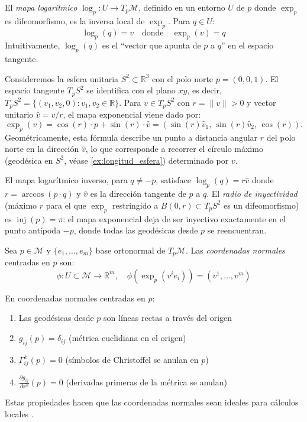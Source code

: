 \begin{definition}\label{def:mapa_logaritmico}
El \textit{mapa logarítmico} $\log_p: U \to T_p\mathcal{M}$, definido en un entorno $U$ de $p$ donde $\exp_p$ es difeomorfismo, es la inversa local de $\exp_p$. Para $q \in U$:
\[
\log_p(q) = v \quad \text{donde} \quad \exp_p(v) = q
\]
Intuitivamente, $\log_p(q)$ es el ``vector que apunta de $p$ a $q$'' en el espacio tangente.
\end{definition}

\begin{example}\label{ex:mapa_exp_esfera}
Consideremos la esfera unitaria $S^2 \subset \mathbb{R}^3$ con el polo norte $p = (0, 0, 1)$. El espacio tangente $T_p S^2$ se identifica con el plano $xy$, es decir, $T_p S^2 = \{(v_1, v_2, 0) : v_1, v_2 \in \mathbb{R}\}$. Para $v \in T_p S^2$ con $r = \|v\| > 0$ y vector unitario $\hat{v} = v/r$, el mapa exponencial viene dado por:
\[
\exp_p(v) = \cos(r) \cdot p + \sin(r) \cdot \hat{v} = (\sin(r) \hat{v}_1, \, \sin(r) \hat{v}_2, \, \cos(r)).
\]
Geométricamente, esta fórmula describe un punto a distancia angular $r$ del polo norte en la dirección $\hat{v}$, lo que corresponde a recorrer el círculo máximo (geodésica en $S^2$, véase \autoref{ex:longitud_esfera}) determinado por $v$.

El mapa logarítmico inverso, para $q \neq -p$, satisface $\log_p(q) = r \hat{v}$ donde $r = \arccos(p \cdot q)$ y $\hat{v}$ es la dirección tangente de $p$ a $q$. El \textit{radio de inyectividad} (máximo $r$ para el que $\exp_p$ restringido a $B(0, r) \subset T_p S^2$ es un difeomorfismo) es $\operatorname{inj}(p) = \pi$: el mapa exponencial deja de ser inyectivo exactamente en el punto antípoda $-p$, donde todas las geodésicas desde $p$ se reencuentran.
\end{example}

\begin{definition}\label{def:coordenadas_normales}
Sea $p \in \mathcal{M}$ y $\{e_1, \ldots, e_m\}$ base ortonormal de $T_p\mathcal{M}$. Las \textit{coordenadas normales} centradas en $p$ son:
\[
\phi: U \subset \mathcal{M} \to \mathbb{R}^m, \quad \phi(\exp_p(v^i e_i)) = (v^1, \ldots, v^m)
\]
\end{definition}

\begin{proposition}\label{prop:coordenadas_normales}
En coordenadas normales centradas en $p$:
\begin{enumerate}
	\item Las geodésicas desde $p$ son líneas rectas a través del origen
	\item $g_{ij}(p) = \delta_{ij}$ (métrica euclidiana en el origen)
	\item $\Gamma^k_{ij}(p) = 0$ (símbolos de Christoffel se anulan en $p$)
	\item $\frac{\partial g_{ij}}{\partial x^k}(p) = 0$ (derivadas primeras de la métrica se anulan)
\end{enumerate}
Estas propiedades hacen que las coordenadas normales sean ideales para cálculos locales \citep[cf.][Proposición~5.24]{lee2018introduction}.
\end{proposition}

